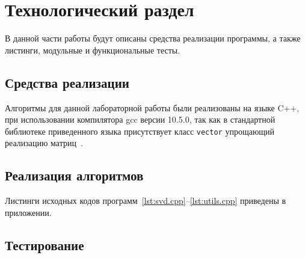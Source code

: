 \chapter{Технологический раздел}

В данной части работы будут описаны средства реализации программы, а также листинги, модульные и функциональные тесты.

\section{Средства реализации}
Алгоритмы для данной лабораторной работы были реализованы на языке C++, при использовании компилятора gcc версии 10.5.0, так как в стандартной библиотеке приведенного языка
присутствует класс \texttt{vector} упрощающий реализацию матриц~\cite{vector}.



\section{Реализация алгоритмов}
Листинги исходных кодов программ~\ref{lst:svd.cpp}--\ref{lst:utils.cpp} приведены в приложении.


\section{Тестирование}


